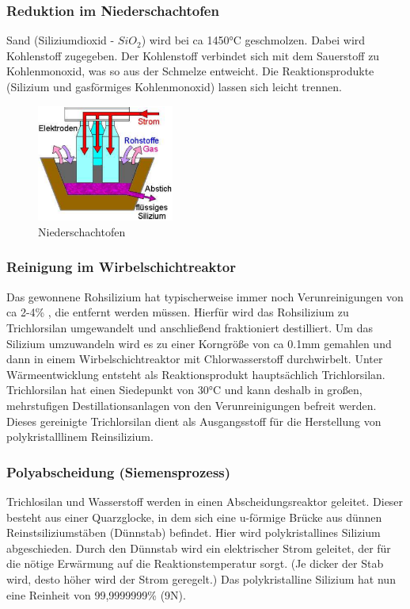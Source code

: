 	\subsubsection{Reduktion im Niederschachtofen}
		Sand (Siliziumdioxid - $SiO_2$) wird bei ca 1450°C geschmolzen. Dabei wird Kohlenstoff zugegeben. Der Kohlenstoff verbindet sich mit dem Sauerstoff zu Kohlenmonoxid, was so aus der Schmelze entweicht. Die Reaktionsprodukte (Silizium und gasförmiges Kohlenmonoxid) lassen sich leicht trennen.
		\begin{figure}[h!]
			\centering
			\includegraphics[width=0.4\textwidth]{Kapitel/Kap02/niederschachtofen.PNG}
			\caption{Niederschachtofen}
			\label{02_niederschachtofen}
		\end{figure}
		
	\subsubsection{Reinigung im Wirbelschichtreaktor}
		Das gewonnene Rohsilizium hat typischerweise immer noch Verunreinigungen von ca 2-4\% , die entfernt werden müssen. Hierfür wird das Rohsilizium zu Trichlorsilan umgewandelt und anschließend fraktioniert destilliert. Um das Silizium umzuwandeln wird es zu einer Korngröße von ca 0.1mm gemahlen und dann in einem Wirbelschichtreaktor mit Chlorwasserstoff durchwirbelt. Unter Wärmeentwicklung entsteht als Reaktionsprodukt hauptsächlich Trichlorsilan.
		Trichlorsilan hat einen Siedepunkt von 30°C und kann deshalb in großen, mehrstufigen Destillationsanlagen von den Verunreinigungen befreit werden. Dieses gereinigte Trichlorsilan dient als Ausgangsstoff für die Herstellung von polykristalllinem Reinsilizium.
		
	\subsubsection{Polyabscheidung (Siemensprozess)}
		Trichlosilan und Wasserstoff werden in einen Abscheidungsreaktor geleitet. Dieser besteht aus einer Quarzglocke, in dem sich eine u-förmige Brücke aus dünnen Reinstsiliziumstäben (Dünnstab) befindet. Hier wird polykristallines Silizium abgeschieden. Durch den Dünnstab wird ein elektrischer Strom geleitet, der für die nötige Erwärmung auf die Reaktionstemperatur sorgt. (Je dicker der Stab wird, desto höher wird der Strom geregelt.) Das polykristalline Silizium hat nun eine Reinheit von 99,9999999\% (9N).
